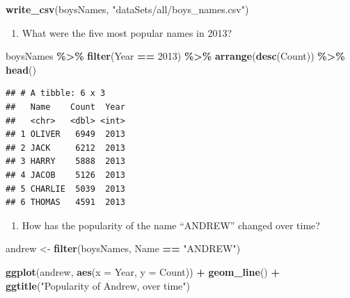 \documentclass[
]{book}
\newenvironment{Shaded}{\begin{snugshade}}{\end{snugshade}}
\newcommand{\DataTypeTok}[1]{\textcolor[rgb]{0.13,0.29,0.53}{#1}}
\newcommand{\DecValTok}[1]{\textcolor[rgb]{0.00,0.00,0.81}{#1}}
\newcommand{\KeywordTok}[1]{\textcolor[rgb]{0.13,0.29,0.53}{\textbf{#1}}}
\newcommand{\NormalTok}[1]{#1}
\newcommand{\OperatorTok}[1]{\textcolor[rgb]{0.81,0.36,0.00}{\textbf{#1}}}
\newcommand{\StringTok}[1]{\textcolor[rgb]{0.31,0.60,0.02}{#1}}
\providecommand{\tightlist}{%
  \setlength{\itemsep}{0pt}\setlength{\parskip}{0pt}}
\begin{document}
\begin{alert}
\begin{Shaded}
\begin{Highlighting}[]
\KeywordTok{write\_csv}\NormalTok{(boysNames, }\StringTok{"dataSets/all/boys\_names.csv"}\NormalTok{)}
\end{Highlighting}
\end{Shaded}

\begin{enumerate}
\def\labelenumi{\arabic{enumi}.}
\setcounter{enumi}{2}
\tightlist
\item
  What were the five most popular names in 2013?
\end{enumerate}

\begin{Shaded}
\begin{Highlighting}[]
\NormalTok{boysNames }\OperatorTok{\%\textgreater{}\%}\StringTok{ }
\StringTok{  }\KeywordTok{filter}\NormalTok{(Year }\OperatorTok{==}\StringTok{ }\DecValTok{2013}\NormalTok{) }\OperatorTok{\%\textgreater{}\%}
\StringTok{  }\KeywordTok{arrange}\NormalTok{(}\KeywordTok{desc}\NormalTok{(Count)) }\OperatorTok{\%\textgreater{}\%}
\StringTok{  }\KeywordTok{head}\NormalTok{()}
\end{Highlighting}
\end{Shaded}

\begin{verbatim}
## # A tibble: 6 x 3
##   Name    Count  Year
##   <chr>   <dbl> <int>
## 1 OLIVER   6949  2013
## 2 JACK     6212  2013
## 3 HARRY    5888  2013
## 4 JACOB    5126  2013
## 5 CHARLIE  5039  2013
## 6 THOMAS   4591  2013
\end{verbatim}

\begin{enumerate}
\def\labelenumi{\arabic{enumi}.}
\setcounter{enumi}{3}
\tightlist
\item
  How has the popularity of the name ``ANDREW'' changed over time?
\end{enumerate}

\begin{Shaded}
\begin{Highlighting}[]
\NormalTok{andrew \textless{}{-}}\StringTok{ }\KeywordTok{filter}\NormalTok{(boysNames, Name }\OperatorTok{==}\StringTok{ "ANDREW"}\NormalTok{)}

\KeywordTok{ggplot}\NormalTok{(andrew, }\KeywordTok{aes}\NormalTok{(}\DataTypeTok{x =}\NormalTok{ Year, }\DataTypeTok{y =}\NormalTok{ Count)) }\OperatorTok{+}
\StringTok{    }\KeywordTok{geom\_line}\NormalTok{() }\OperatorTok{+}
\StringTok{    }\KeywordTok{ggtitle}\NormalTok{(}\StringTok{"Popularity of Andrew, over time"}\NormalTok{)}
\end{Highlighting}
\end{Shaded}


\end{alert}
\end{document}
